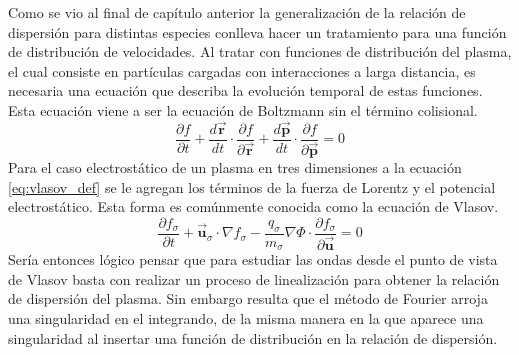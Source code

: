 \documentclass[../tesis_main_file.tex]{subfile}
\begin{document}
Como se vio al final de capítulo anterior la generalización de la relación de dispersión para distintas especies conlleva hacer un tratamiento para una función de distribución de velocidades. 
Al tratar con funciones de distribución del plasma, el cual consiste en partículas cargadas con interacciones a larga distancia, es necesaria una ecuación que describa la evolución temporal de estas funciones. Esta ecuación viene a ser la ecuación de Boltzmann sin el término colisional. \cite{bellan2008fundamentals}\\
\begin{equation}
\label{eq:vlasov_def}
\frac{\partial f}{\partial t} + \frac{d\overrightarrow{\textbf{r}}}{dt}\cdot \frac{\partial f}{\partial \overrightarrow{\textbf{r}}} + \frac{d \overrightarrow{\textbf{p}}}{dt}\cdot \frac{\partial f}{\partial \overrightarrow{\textbf{p}}}=0
\end{equation}
Para el caso electrostático de un plasma en tres dimensiones a la ecuación \ref{eq:vlasov_def} se le agregan los términos de la fuerza de Lorentz y el potencial electrostático. Esta forma es comúnmente conocida como la ecuación de Vlasov.
\begin{equation}
\label{eq:vlasov-poisson_3D}
\frac{\partial f_{\sigma}}{\partial t} + \overrightarrow{\textbf{u}}_{\sigma} \cdot \nabla f_{\sigma} -\frac{q_{\sigma}}{m_{\sigma}}\nabla \Phi \cdot \frac{\partial f_{\sigma}}{\partial \overrightarrow{\textbf{u}}}=0
\end{equation}
Sería entonces lógico pensar que para estudiar las ondas desde el punto de vista de Vlasov basta con realizar un proceso de linealización para obtener la relación de dispersión del plasma. Sin embargo resulta que el método de Fourier arroja una singularidad en el integrando, de la misma manera en la que aparece una singularidad al insertar una función de distribución en la relación de dispersión.\\
\end{document}
